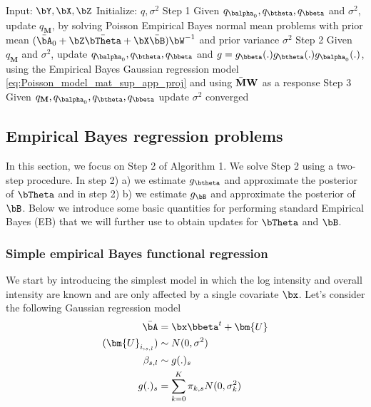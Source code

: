  




\begin{algorithm}
\caption{Splitting Variational Bayes approach for inhomogeneous Poisson data high level} \label{alg:ibss}
\begin{algorithmic}[1]
 \STATE Input: $\bY , \bX, \bZ$ 
 \STATE Initialize: $q, \sigma^2$ 
\REPEAT  
\STATE   Step 1 Given $ q_{\balpha_0}, q_{\btheta},q_{\bbeta } $  and $\sigma^2$, update $q_{\mathbf{  M }}$, by solving Poisson  Empirical Bayes normal mean problems with prior mean $(\bar\bA_0+ \bZ\bar\bTheta+\bX\bar\bB)\bW^{-1}$ and prior variance $ \sigma^2$ 
\STATE Step 2 Given $q_{\mathbf{  M }}$ and $ \sigma ^2$, update $q_{\balpha_0}  , q_{\btheta}, q_{\bbeta }$ and $g= g _{\bbeta}(.)g_{\btheta} (.) g_{\balpha_0} (.)$, using the Empirical Bayes Gaussian regression model \ref{eq:Poisson_model_mat_sup_app_proj} and using $ \Bar{\mathbf{  M } }\mathbf{W}$ as a response
\STATE  Step 3  Given $q_{\mathbf M}, q_{\balpha_0}, q_{\btheta},q_{\bbeta }$  update $\sigma ^2 $
\UNTIL converged
\end{algorithmic}
\end{algorithm}


\subsection{Empirical  Bayes regression problems}
In this section, we focus on  Step 2  of Algorithm 1. We   solve Step 2 using a two-step procedure. In step 2) a) we  estimate $g_{\btheta}$ and approximate the posterior of  $\bTheta$ and in step 2) b) we estimate $g_{\bB}$ and approximate the posterior of   $\bB$. Below we  introduce some basic quantities for performing standard Empirical Bayes (EB)  that we will further use to obtain updates for  $\bTheta$ and $\bB$.

\subsubsection{Simple empirical Bayes functional regression}
We start by introducing the simplest model in which the log intensity and overall intensity are known and are only affected by a single covariate $\bx$. Let's consider the following Gaussian  regression model
\begin{align} 
    \bar{\bA} & = \bx  \bbeta^{ t}    +\bm{U}  \label{eq:simpleSFR_mix_per_scale}\\
    (\bm{U}_{i,_{s,l}}) &   \sim N(0,\sigma^2) \\
    \beta_{ s,l} &  \sim g(.)_{s}\\
    g(.)_{s}&=\sum_{k=0}^K \pi_{k ,s} N(0,\sigma_{k }^2)
\end{align}

